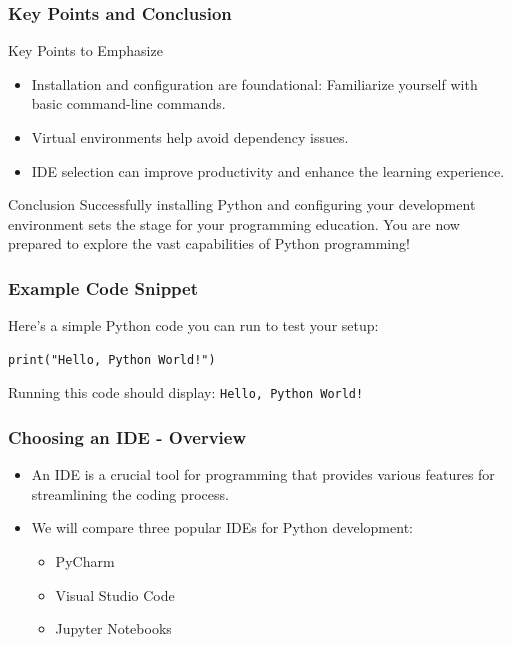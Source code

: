 \documentclass{beamer}
\begin{document}
\begin{frame}[fragile]
    \frametitle{Key Points and Conclusion}
    \begin{block}{Key Points to Emphasize}
        \begin{itemize}
            \item Installation and configuration are foundational: Familiarize yourself with basic command-line commands.
            \item Virtual environments help avoid dependency issues.
            \item IDE selection can improve productivity and enhance the learning experience.
        \end{itemize}
    \end{block}

    \begin{block}{Conclusion}
        Successfully installing Python and configuring your development environment sets the stage for your programming education. You are now prepared to explore the vast capabilities of Python programming!
    \end{block}
\end{frame}

\begin{frame}[fragile]
    \frametitle{Example Code Snippet}
    Here’s a simple Python code you can run to test your setup:
    \begin{lstlisting}
print("Hello, Python World!")
    \end{lstlisting}

    Running this code should display: \texttt{Hello, Python World!}
\end{frame}

\begin{frame}[fragile]
    \frametitle{Choosing an IDE - Overview}
    \begin{itemize}
        \item An IDE is a crucial tool for programming that provides various features for streamlining the coding process.
        \item We will compare three popular IDEs for Python development:
        \begin{itemize}
            \item PyCharm
            \item Visual Studio Code
            \item Jupyter Notebooks
        \end{itemize}
    \end{itemize}
\end{frame}
\end{document}
